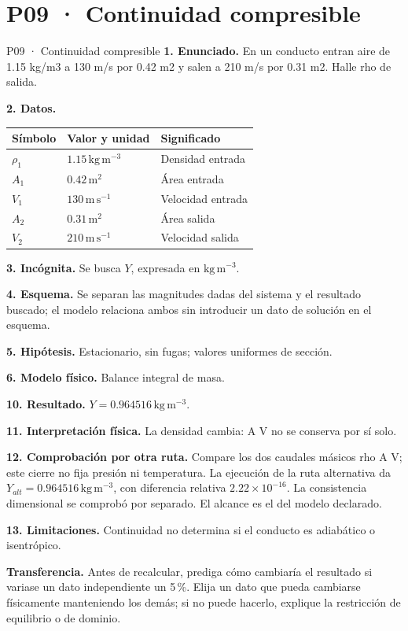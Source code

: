 \chapter*{P09 · Continuidad compresible}
\begin{studiumworked}{P09 · Continuidad compresible}
\textbf{1. Enunciado.} En un conducto entran aire de 1.15 kg/m3 a 130 m/s por 0.42 m2 y salen a 210 m/s por 0.31 m2. Halle rho de salida.

\textbf{2. Datos.}
\begin{longtable}{p{.16\linewidth}p{.35\linewidth}p{.38\linewidth}}\toprule Símbolo & Valor y unidad & Significado\\\midrule\endhead
$\rho_{1}$ & $1.15\,\mathrm{kg\,m^{-3}}$ & Densidad entrada\\
$A_{1}$ & $0.42\,\mathrm{m^2}$ & Área entrada\\
$V_{1}$ & $130\,\mathrm{m\,s^{-1}}$ & Velocidad entrada\\
$A_{2}$ & $0.31\,\mathrm{m^2}$ & Área salida\\
$V_{2}$ & $210\,\mathrm{m\,s^{-1}}$ & Velocidad salida\\
\bottomrule\end{longtable}
\textbf{3. Incógnita.} Se busca $Y$, expresada en $\mathrm{kg\,m^{-3}}$.

\textbf{4. Esquema.} Se separan las magnitudes dadas del sistema y el resultado buscado; el modelo relaciona ambos sin introducir un dato de solución en el esquema.

\textbf{5. Hipótesis.} Estacionario, sin fugas; valores uniformes de sección.

\textbf{6. Modelo físico.} Balance integral de masa.


\textbf{10. Resultado.} $Y=0.964516\,\mathrm{kg\,m^{-3}}$.

\textbf{11. Interpretación física.} La densidad cambia: A V no se conserva por sí solo.

\textbf{12. Comprobación por otra ruta.} Compare los dos caudales másicos rho A V; este cierre no fija presión ni temperatura. La ejecución de la ruta alternativa da $Y_{alt}=0.964516\,\mathrm{kg\,m^{-3}}$, con diferencia relativa $2.22\times10^{-16}$. La consistencia dimensional se comprobó por separado. El alcance es el del modelo declarado.

\textbf{13. Limitaciones.} Continuidad no determina si el conducto es adiabático o isentrópico.

\textbf{Transferencia.} Antes de recalcular, prediga cómo cambiaría el resultado si variase un dato independiente un 5\,\%. Elija un dato que pueda cambiarse físicamente manteniendo los demás; si no puede hacerlo, explique la restricción de equilibrio o de dominio.\par
\end{studiumworked}
